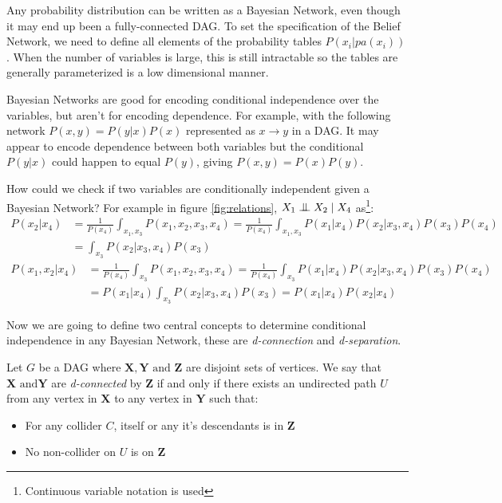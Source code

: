 Any probability distribution can be written as a Bayesian Network, even though
it may end up been a fully-connected DAG.
To set the specification of the Belief Network, we need to define all elements of the probability
tables \(P(x_i|pa(x_i))\). When the number of variables is large, this is still
intractable so the tables are generally parameterized is a low dimensional
manner.

Bayesian Networks are good for encoding conditional independence over the
variables, but aren't for encoding dependence. For example, with the following
network \(P(x,y) = P(y|x)P(x)\) represented as \(x \to y\) in a DAG.
It may appear to encode dependence between both variables but the
conditional \(P(y|x)\) could happen to equal \(P(y)\), giving \(P(x,y) = P(x)P(y)\).

How could we check if two variables are conditionally independent given a
Bayesian Network? For example in figure \ref{fig:relations}, \(X_1 \bigCI
X_2 \mid X_4\) as\footnote{Continuous variable notation is used}:
\[
\begin{aligned}
P(x_2 | x_4) &= \frac{1}{P(x_4)}\int_{x_1,x_3}P(x_1, x_2, x_3, x_4)
= \frac{1}{P(x_4)}\int_{x_1,x_3}P(x_1|x_4)P(x_2|x_3,x_4)P(x_3)P(x_4)\\
                 &= \int_{x_3}P(x_2|x_3, x_4)P(x_3)
\end{aligned}
\]
\[
\begin{aligned}
P(x_1, x_2 | x_4) &= \frac{1}{P(x_4)}\int_{x_3}P(x_1, x_2, x_3, x_4)
= \frac{1}{P(x_4)}\int_{x_3}P(x_1|x_4)P(x_2|x_3,x_4)P(x_3)P(x_4)\\
                 &= P(x_1|x_4)\int_{x_3}P(x_2|x_3, x_4)P(x_3) = P(x_1|x_4)P(x_2|x_4)
\end{aligned}
\]

Now we are going to define two central concepts to determine conditional
independence in any Bayesian Network, these are \emph{d-connection} and \emph{d-separation}.

\begin{definition}
Let \(G\) be a DAG where \(\bm{X}, \bm{Y} \text{ and } \bm{Z}\)
are disjoint sets of vertices. We say that \(\bm{X} \text{ and
} \bm{Y}\) are \emph{d-connected} by \(\bm{Z}\) if and only if there
exists an undirected path \(U\) from any vertex in \(\bm{X}\) to any
vertex in \(\bm{Y}\) such that:
\begin{itemize}
\item For any collider \(C\), itself or any it's descendants is in \(\bm{Z}\)
\item No non-collider on \(U\) is on \(\bm{Z}\)
\end{itemize}
\end{definition}

